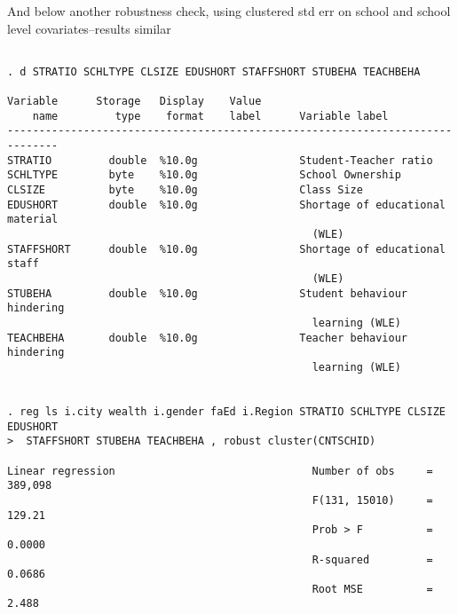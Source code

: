 \documentclass[10pt, letterpaper]{article}
\begin{document}
\begin{spacing}{1.4}
And below another robustness check, using clustered std err on school and school
level covariates--results similar
\begin{spacing}{.5}
\begin{scriptsize}
\begin{verbatim}

. d STRATIO SCHLTYPE CLSIZE EDUSHORT STAFFSHORT STUBEHA TEACHBEHA 

Variable      Storage   Display    Value
    name         type    format    label      Variable label
------------------------------------------------------------------------------
STRATIO         double  %10.0g                Student-Teacher ratio
SCHLTYPE        byte    %10.0g                School Ownership
CLSIZE          byte    %10.0g                Class Size
EDUSHORT        double  %10.0g                Shortage of educational material
                                                (WLE)
STAFFSHORT      double  %10.0g                Shortage of educational staff
                                                (WLE)
STUBEHA         double  %10.0g                Student behaviour hindering
                                                learning (WLE)
TEACHBEHA       double  %10.0g                Teacher behaviour hindering
                                                learning (WLE)


. reg ls i.city wealth i.gender faEd i.Region STRATIO SCHLTYPE CLSIZE EDUSHORT
>  STAFFSHORT STUBEHA TEACHBEHA , robust cluster(CNTSCHID)

Linear regression                               Number of obs     =    389,098
                                                F(131, 15010)     =     129.21
                                                Prob > F          =     0.0000
                                                R-squared         =     0.0686
                                                Root MSE          =      2.488


\end{verbatim}
\end{scriptsize}
\end{spacing}
\end{spacing}
\end{document}
